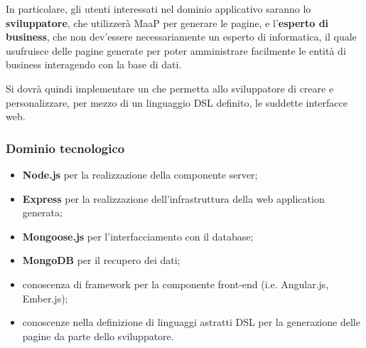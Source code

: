        
In particolare, gli utenti interessati nel dominio applicativo saranno lo \textbf{sviluppatore}, che utilizzerà MaaP per generare le pagine, e l'\textbf{esperto di business}, che non dev'essere necessariamente un esperto di informatica, il quale usufruisce delle pagine generate per poter amministrare facilmente le entità di business interagendo con la base di dati.

Si dovrà quindi implementare un  che permetta allo sviluppatore di creare e personalizzare, per mezzo di un linguaggio DSL definito, le suddette interfacce web.
        
        \subsubsection{Dominio tecnologico}
        \begin{itemize}
                \item \textbf{Node.js} per la realizzazione della componente server;
                \item \textbf{Express} per la realizzazione dell’infrastruttura della web application generata;
                \item \textbf{Mongoose.js} per l’interfacciamento con il database;
                \item \textbf{MongoDB} per il recupero dei dati;
                \item conoscenza di framework per la componente front-end (i.e. Angular.js, Ember.js);
                \item conoscenze nella definizione di linguaggi astratti DSL per la generazione delle pagine da parte dello sviluppatore.
        \end{itemize}


